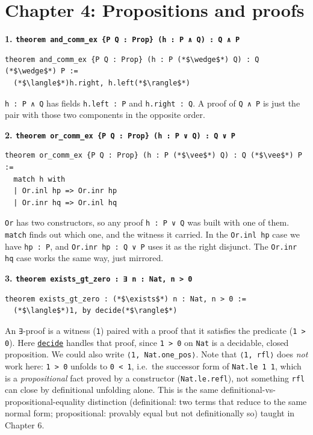 \section{Chapter 4: Propositions and proofs}\label{sec:15-appendix-solutions:04-chapter-4:1}

\textbf{1. \texttt{theorem and\_\allowbreak{}comm\_\allowbreak{}ex \{P Q : Prop\} (h : P ∧ Q) : Q ∧ P}}

\begin{lstlisting}
theorem and_comm_ex {P Q : Prop} (h : P (*$\wedge$*) Q) : Q (*$\wedge$*) P :=
  (*$\langle$*)h.right, h.left(*$\rangle$*)
\end{lstlisting}

\texttt{h : P ∧ Q} has fields \texttt{h.left : P} and \texttt{h.right : Q}. A proof of \texttt{Q ∧ P} is just the pair with those two components in the opposite order.

\textbf{2. \texttt{theorem or\_\allowbreak{}comm\_\allowbreak{}ex \{P Q : Prop\} (h : P ∨ Q) : Q ∨ P}}

\begin{lstlisting}
theorem or_comm_ex {P Q : Prop} (h : P (*$\vee$*) Q) : Q (*$\vee$*) P :=
  match h with
  | Or.inl hp => Or.inr hp
  | Or.inr hq => Or.inl hq
\end{lstlisting}

\texttt{Or} has two constructors, so any proof \texttt{h : P ∨ Q} was built with one of them. \texttt{match} finds out which one, and the witness it carried. In the \texttt{Or.inl hp} case we have \texttt{hp : P}, and \texttt{Or.inr hp : Q ∨ P} uses it as the right disjunct. The \texttt{Or.inr hq} case works the same way, just mirrored.

\textbf{3. \texttt{theorem exists\_\allowbreak{}gt\_\allowbreak{}zero : ∃ n : Nat, n > 0}}

\begin{lstlisting}
theorem exists_gt_zero : (*$\exists$*) n : Nat, n > 0 :=
  (*$\langle$*)1, by decide(*$\rangle$*)
\end{lstlisting}

An \texttt{∃}-proof is a witness (\texttt{1}) paired with a proof that it satisfies the predicate (\texttt{1 > 0}). Here \href{https://lean-lang.org/doc/reference/latest/Tactic-Proofs/Tactic-Reference/}{\texttt{decide}} handles that proof, since \texttt{1 > 0} on \texttt{Nat} is a decidable, closed proposition. We could also write \texttt{⟨1, Nat.one\_\allowbreak{}pos⟩}. Note that \texttt{⟨1, rfl⟩} does \emph{not} work here: \texttt{1 > 0} unfolds to \texttt{0 < 1}, i.e.~the successor form of \texttt{Nat.le 1 1}, which is a \emph{propositional} fact proved by a constructor (\texttt{Nat.le.refl}), not something \texttt{rfl} can close by definitional unfolding alone. This is the same definitional-vs-propositional-equality distinction (definitional: two terms that reduce to the same normal form; propositional: provably equal but not definitionally so) taught in Chapter 6.

